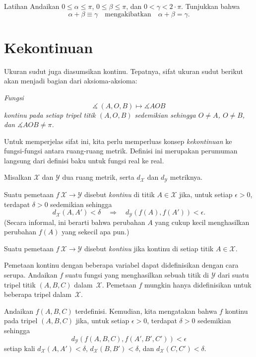 \begin{thm}{Latihan}\label{ex:a+b==c}
Andaikan $0\le \alpha\le \pi$, $0\le \beta\le \pi$, dan $0<\gamma<2\cdot \pi$.
Tunjukkan bahwa
\[\alpha+\beta\equiv \gamma\quad\text{mengakibatkan}\quad\alpha+\beta=\gamma.\]
\end{thm}


\section{Kekontinuan}

Ukuran sudut juga diasumsikan kontinu.
Tepatnya, sifat ukuran sudut berikut akan menjadi bagian dari aksioma-aksioma:

\textit{Fungsi}
$$\measuredangle\:(A,O,B)\mapsto\measuredangle A O B$$
\textit{kontinu pada setiap tripel titik $(A,O,B)$
sedemikian sehingga $O\ne A$, $O\ne B$, dan $\measuredangle A O B\ne\pi$.}

Untuk memperjelas sifat ini, kita perlu memperluas konsep {}\emph{kekontinuan} ke fungsi-fungsi antara ruang-ruang metrik.
Definisi ini merupakan perumuman langsung dari definisi baku untuk fungsi real ke real.

Misalkan $\mathcal X$ dan $\mathcal Y$ dua ruang metrik,
serta $d_{\mathcal X}$ dan $d_{\mathcal Y}$ metriknya.

Suatu pemetaan $f\:\mathcal X\to\mathcal Y$ disebut \emph{kontinu} di titik $A\in \mathcal X$
jika, untuk setiap $\epsilon>0$, terdapat $\delta>0$ sedemikian sehingga 
\[d_{\mathcal X}(A,A')
<
\delta
\quad
\Rightarrow
\quad
d_{\mathcal Y}(f(A),f(A'))
<
\epsilon.\]
(Secara informal, ini berarti bahwa perubahan $A$ yang cukup kecil menghasilkan perubahan $f(A)$ yang sekecil apa pun.)

Suatu pemetaan $f\:\mathcal X\to\mathcal Y$ disebut \emph{kontinu} jika kontinu di setiap titik $A\in \mathcal X$.

Pemetaan kontinu dengan beberapa variabel dapat didefinisikan dengan cara serupa.
Andaikan $f$ suatu fungsi yang menghasilkan sebuah titik di $\mathcal Y$ dari suatu tripel titik $(A,B,C)$
dalam~$\mathcal X$.
Pemetaan $f$ mungkin hanya didefinisikan untuk beberapa tripel dalam~$\mathcal X$.

Andaikan $f(A,B,C)$ terdefinisi.
Kemudian, kita mengatakan bahwa $f$ kontinu pada tripel $(A,B,C)$ 
jika, untuk setiap $\epsilon>0$, terdapat $\delta>0$ sedemikian sehingga
\[d_{\mathcal Y}(f(A,B,C),f(A',B',C'))<\epsilon\]
setiap kali $d_{\mathcal X}(A,A')<\delta$, $d_{\mathcal X}(B,B')<\delta$, dan $d_{\mathcal X}(C,C')<\delta$.


